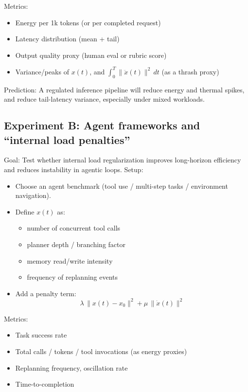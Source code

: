 \documentclass[11pt]{article}
\begin{document}
Metrics:

\begin{itemize}
\item Energy per 1k tokens (or per completed request)
\item Latency distribution (mean + tail)
\item Output quality proxy (human eval or rubric score)
\item Variance/peaks of \(x(t)\), and \(\int_{0}^{T}\lVert\ddot{x}(t)\rVert^{2}\,dt\) (as a thrash proxy)
\end{itemize}

Prediction: A regulated inference pipeline will reduce energy and thermal spikes, and reduce tail-latency variance, especially under mixed workloads.

\subsection{Experiment B: Agent frameworks and “internal load penalties”}
Goal: Test whether internal load regularization improves long-horizon efficiency and reduces instability in agentic loops. Setup:

\begin{itemize}
\item Choose an agent benchmark (tool use / multi-step tasks / environment navigation).
\item Define \(x(t)\) as:
\begin{itemize}
\item number of concurrent tool calls
\item planner depth / branching factor
\item memory read/write intensity
\item frequency of replanning events
\end{itemize}

\item Add a penalty term:
\[
\lambda \,\lVert x(t)-x_{0}\rVert^{2}+\mu\,\lVert \dot{x}(t)\rVert^{2}
\]
\end{itemize}

Metrics:

\begin{itemize}
\item Task success rate
\item Total calls / tokens / tool invocations (as energy proxies)
\item Replanning frequency, oscillation rate
\item Time-to-completion
\end{itemize}
\end{document}
